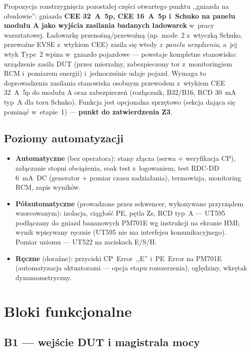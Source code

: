 \documentclass[11pt,a4paper]{article}
\begin{document}
Propozycja rozstrzygnięcia pozostałej części otwartego punktu ,,gniazda na obudowie'': gniazda \textbf{CEE 32~A~5p, CEE 16~A~5p i~Schuko na panelu modułu A jako wyjścia zasilania badanych ładowarek} w~pracy warsztatowej. Ładowarkę przenośną/przewoźną (np. mode~2 z~wtyczką Schuko, przewoźne EVSE z~wtykiem CEE) zasila się wtedy \emph{z~panelu urządzenia}, a~jej wtyk Type~2 wpina w~gniazdo pojazdowe --- powstaje kompletne stanowisko: urządzenie zasila DUT (przez mierzalny, zabezpieczony tor z~monitoringiem RCM i~pomiarem energii) i~jednocześnie udaje pojazd. Wymaga to doprowadzenia zasilania stanowiska osobnym przewodem z~wtykiem CEE 32~A~5p do modułu A oraz zabezpieczeń (rozłącznik, B32/B16, RCD 30~mA typ~A dla toru Schuko). Funkcja jest opcjonalna sprzętowo (sekcja dająca się pominąć w~etapie~1) --- \textbf{punkt do zatwierdzenia Z3}.

\subsection{Poziomy automatyzacji}

\begin{itemize}
\item \textbf{Automatyczne} (bez operatora): stany złącza (serwa + weryfikacja CP), załączanie stopni obciążenia, soak test z~logowaniem, test RDC-DD 6~mA~DC (generator + pomiar czasu zadziałania), termowizja, monitoring RCM, zapis wyników.
\item \textbf{Półautomatyczne} (prowadzone przez sekwencer, wykonywane przyrządem wzorcowanym): izolacja, ciągłość PE, pętla Zs, RCD typ~A --- UT595 podłączany do gniazd bananowych PM701E wg instrukcji na ekranie HMI; wynik wpisywany ręcznie (UT595 nie ma interfejsu komunikacyjnego). Pomiar uziomu --- UT522 na zaciskach E/S/H.
\item \textbf{Ręczne} (doraźne): przyciski CP~Error~,,E'' i~PE~Error na PM701E (automatyzacja aktuatorami --- opcja etapu rozszerzenia), oględziny, wkrętak dynamometryczny.
\end{itemize}

\section{Bloki funkcjonalne}
\label{sec:bloki}

\subsection{B1 --- wejście DUT i magistrala mocy}
\label{sec:b1}
\end{document}
